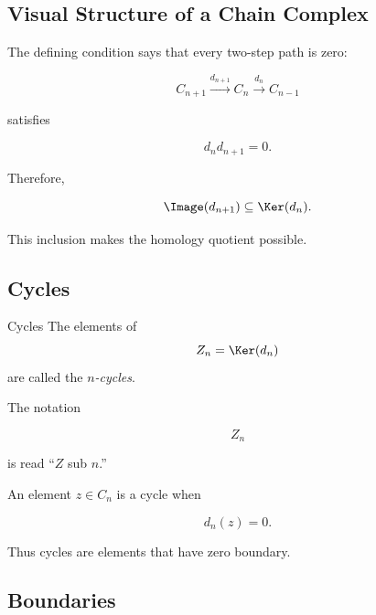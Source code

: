 \subsection{Visual Structure of a Chain Complex}
\label{subsec:chain-complex-visual}

\begin{center}
\end{center}

The defining condition says that every two-step path is zero:

\[ C_{n+1}\xrightarrow{d_{n+1}}C_n\xrightarrow{d_n}C_{n-1} \]

satisfies

\[ d_nd_{n+1}=0. \]

Therefore,

\[ \Image(d_{n+1})\subseteq\Ker(d_n). \]

This inclusion makes the homology quotient possible.

\subsection{Cycles}
\label{subsec:cycles}

\begin{definitionbox}{Cycles}
The elements of
\[ Z_n=\Ker(d_n) \]
are called the \emph{\(n\)-cycles}.
\end{definitionbox}

The notation

\[ Z_n \]

is read ``\(Z\) sub \(n\).''

An element \(z\in C_n\) is a cycle when

\[ d_n(z)=0. \]

Thus cycles are elements that have zero boundary.

\subsection{Boundaries}
\label{subsec:boundaries}

